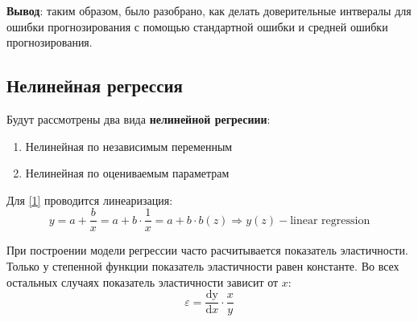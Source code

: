 \documentclass[aps,%
12pt,%
final,%
oneside,
onecolumn,%
musixtex, %
superscriptaddress,%
centertags]{article} %
\begin{document}
\textbf{Вывод}: таким образом, было разобрано, как делать доверительные интвералы для ошибки прогнозирования с помощью стандартной ошибки и средней ошибки прогнозирования.
\newpage
\subsection{Нелинейная регрессия}
Будут рассмотрены два вида \textbf{нелинейной регресиии}:
\begin{enumerate}
	\item \label{1} Нелинейная по независимым переменным
	\item Нелинейная по оцениваемым параметрам 
\end{enumerate}

Для \ref{1} проводится линеаризация:
$$ y = a+ \frac{b}{x} = a+b \cdot \frac{1}{x} = a+b \cdot b(z) \Rightarrow y(z) - \text{linear regression}$$

При построении модели регрессии часто расчитывается показатель эластичности. Только у степенной функции показатель эластичности равен константе. Во всех остальных случаях показатель эластичности зависит от $x$:
$$ \varepsilon = \frac{\mathrm{dy} }{\mathrm{d} x} \cdot{\frac{x}{y}}$$
\end{document}

